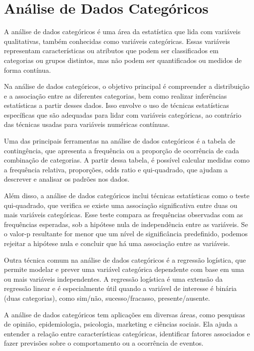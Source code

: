 \chapter{Análise de Dados Categóricos}

A análise de dados categóricos é uma área da estatística que lida com variáveis qualitativas, também conhecidas como variáveis categóricas. Essas variáveis representam características ou atributos que podem ser classificados em categorias ou grupos distintos, mas não podem ser quantificados ou medidos de forma contínua.

Na análise de dados categóricos, o objetivo principal é compreender a distribuição e a associação entre as diferentes categorias, bem como realizar inferências estatísticas a partir desses dados. Isso envolve o uso de técnicas estatísticas específicas que são adequadas para lidar com variáveis categóricas, ao contrário das técnicas usadas para variáveis numéricas contínuas.

Uma das principais ferramentas na análise de dados categóricos é a tabela de contingência, que apresenta a frequência ou a proporção de ocorrência de cada combinação de categorias. A partir dessa tabela, é possível calcular medidas como a frequência relativa, proporções, odds ratio e qui-quadrado, que ajudam a descrever e analisar os padrões nos dados.

Além disso, a análise de dados categóricos inclui técnicas estatísticas como o teste qui-quadrado, que verifica se existe uma associação significativa entre duas ou mais variáveis categóricas. Esse teste compara as frequências observadas com as frequências esperadas, sob a hipótese nula de independência entre as variáveis. Se o valor-p resultante for menor que um nível de significância predefinido, podemos rejeitar a hipótese nula e concluir que há uma associação entre as variáveis.

Outra técnica comum na análise de dados categóricos é a regressão logística, que permite modelar e prever uma variável categórica dependente com base em uma ou mais variáveis independentes. A regressão logística é uma extensão da regressão linear e é especialmente útil quando a variável de interesse é binária (duas categorias), como sim/não, sucesso/fracasso, presente/ausente.

A análise de dados categóricos tem aplicações em diversas áreas, como pesquisas de opinião, epidemiologia, psicologia, marketing e ciências sociais. Ela ajuda a entender a relação entre características categóricas, identificar fatores associados e fazer previsões sobre o comportamento ou a ocorrência de eventos.